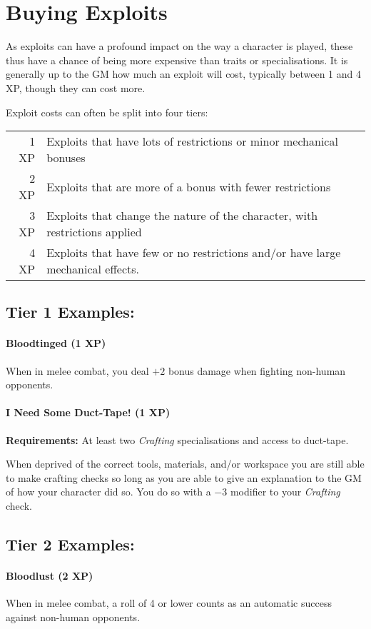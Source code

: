 \section{Buying Exploits}
As exploits can have a profound impact on the way a character is played, these thus have a chance of being more expensive than traits or specialisations.
It is generally up to the GM how much an exploit will cost, typically between 1 and 4 XP, though they can cost more.

Exploit costs can often be split into four tiers:

\begin{tabular}{r | l}
  1 XP & Exploits that have lots of restrictions or minor mechanical bonuses\\
  2 XP & Exploits that are more of a bonus with fewer restrictions\\
  3 XP & Exploits that change the nature of the character, with restrictions applied\\
  4 XP & Exploits that have few or no restrictions and/or have large mechanical effects.
\end{tabular}

\subsection{Tier 1 Examples:}
\paragraph{Bloodtinged (1 XP)}
When in melee combat, you deal $+2$ bonus damage when fighting non-human opponents.

\paragraph{I Need Some Duct-Tape! (1 XP)}
\textbf{Requirements:} At least two \textit{Crafting} specialisations and access to duct-tape.

When deprived of the correct tools, materials, and/or workspace you are still able to make crafting checks so long as you are able to give an explanation to the GM of how your character did so.
You do so with a $-3$ modifier to your \textit{Crafting} check.

\subsection{Tier 2 Examples:}
\paragraph{Bloodlust (2 XP)}
When in melee combat, a roll of 4 or lower counts as an automatic success against non-human opponents.

